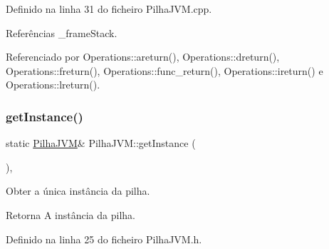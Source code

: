 Definido na linha 31 do ficheiro Pilha\+J\+V\+M.\+cpp.



Referências \+\_\+frame\+Stack.



Referenciado por Operations\+::areturn(), Operations\+::dreturn(), Operations\+::freturn(), Operations\+::func\+\_\+return(), Operations\+::ireturn() e Operations\+::lreturn().

\mbox{\label{classPilhaJVM_a13bf1c43de7819ea7761616f7a04c3b9}} 
\subsubsection{\texorpdfstring{get\+Instance()}{getInstance()}}
{\footnotesize\ttfamily static \hyperlink{classPilhaJVM}{Pilha\+J\+VM}\& Pilha\+J\+V\+M\+::get\+Instance (\begin{DoxyParamCaption}{ }\end{DoxyParamCaption})\hspace{0.3cm}{\ttfamily [inline]}, {\ttfamily [static]}}



Obter a única instância da pilha. 

\begin{DoxyReturn}{Retorna}
A instância da pilha. 
\end{DoxyReturn}


Definido na linha 25 do ficheiro Pilha\+J\+V\+M.\+h.



